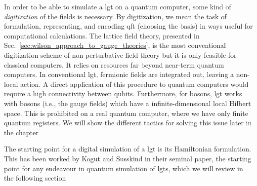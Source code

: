 In order to be able to simulate a \ac{lgt} on a quantum computer, some kind of \emph{digitization} of the fields is necessary.
By digitization, we mean the task of formulation, representing, and encoding \ac{qft} (choosing the basis) in ways useful for computational calculations.
The lattice field theory, presented in Sec.~\ref{sec:wilson_approach_to_gauge_theories}, is the most conventional digitization scheme of non-perturbative field theory but it is only feasible for classical computers.
It relies on resources far beyond near-term quantum computers.
In conventional \ac{lgt}, fermionic fields are integrated out, leaving a non-local action.
A direct application of this procedure to quantum computers would require a high connectivity between qubits.
Furthermore, for bosons, \ac{lgt} works with bosons (i.e., the gauge fields) which have a infinite-dimensional local Hilbert space.
This is prohibited on a real quantum computer, where we have only finite quantum registers.
We will show the different tactics for solving this issue later in the chapter

The starting point for a digital simulation of a \ac{lgt} is its Hamiltonian formulation.
This has been worked by Kogut and Susskind in their seminal paper\citneeded, the starting point for any endeavour in quantum simulation of \ac{lgt}s, which we will review in the following section



